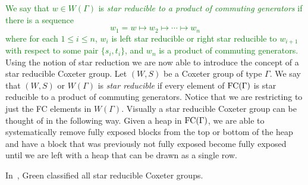 \textcolor{green}{We say that $w \in W(\Gamma)$ is \emph{star reducible to a product of commuting generators} if there is a sequence
\[w_1=w \mapsto w_2 \mapsto \cdots \mapsto w_n\]
where for each $1 \leq i \leq n$, $w_{i}$ is left star reducible or right star reducible to $w_{i+1}$ with respect to some pair $\{s_i, t_i\}$, and $w_n$ is a product of commuting generators.} Using the notion of star reduction we are now able to introduce the concept of a star reducible Coxeter group. Let $(W,S)$ be a Coxeter group of type $\Gamma$. We say that $(W,S)$ or $W(\Gamma)$ is \emph{star reducible} if every element of $\mathrm{FC}(\Gamma)$ is star reducible to a product of commuting generators. Notice that we are restricting to just the FC elements in $W(\Gamma)$. Visually a star reducible Coxeter group can be thought of in the following way. Given a heap in $\mathrm{FC}(\Gamma)$, we are able to systematically remove fully exposed blocks from the top or bottom of the heap and have a block that was previously not fully exposed become fully exposed until we are left with a heap that can be drawn as a single row. 

In~\cite{Green2006a}, Green classified all star reducible Coxeter groups.

